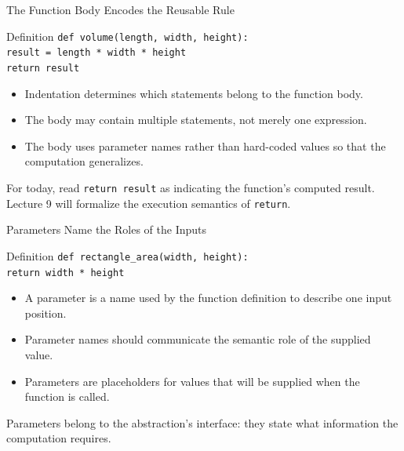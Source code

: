 \documentclass[aspectratio=169,10pt]{beamer}
\begin{document}
\begin{frame}{The Function Body Encodes the Reusable Rule}
  \begin{block}{Definition}
    \texttt{def volume(length, width, height):}\\
    \hspace*{1em}\texttt{result = length * width * height}\\
    \hspace*{1em}\texttt{return result}
  \end{block}

  \begin{itemize}
    \item Indentation determines which statements belong to the function body.
    \item The body may contain multiple statements, not merely one expression.
    \item The body uses parameter names rather than hard-coded values so that the computation generalizes.
  \end{itemize}

  \begin{exampleblockcp}
    For today, read \texttt{return result} as indicating the function's computed result. Lecture 9 will formalize the execution semantics of \texttt{return}.
  \end{exampleblockcp}
\end{frame}

\begin{frame}{Parameters Name the Roles of the Inputs}
  \begin{block}{Definition}
    \texttt{def rectangle\_area(width, height):}\\
    \hspace*{1em}\texttt{return width * height}
  \end{block}

  \begin{itemize}
    \item A parameter is a name used by the function definition to describe one input position.
    \item Parameter names should communicate the semantic role of the supplied value.
    \item Parameters are placeholders for values that will be supplied when the function is called.
  \end{itemize}

  \begin{keyidea}
    Parameters belong to the abstraction's interface: they state what information the computation requires.
  \end{keyidea}
\end{frame}
\end{document}
